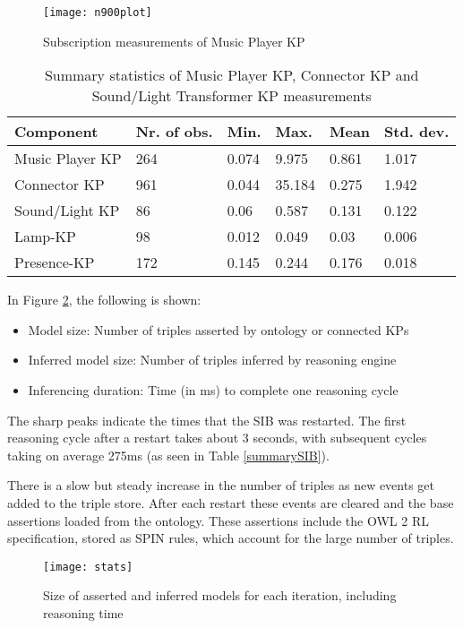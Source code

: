 \begin{figure}
\centering
\texttt{[image: n900plot]}
\caption{Subscription measurements of Music Player KP}
\label{n900plot}
\end{figure}

\begin{table}[!t]
\caption{Summary statistics of Music Player KP, Connector KP and Sound/Light Transformer KP measurements}
\label{summaryKP}
\centering
\begin{tabular}{|l|l|l|l|l|l|}
\hline
Component &	 Nr. of obs. & Min. & Max. & Mean &	Std. dev.\\
\hline
Music Player KP & 264 & 0.074 & 9.975 & 0.861 & 1.017\\
Connector KP & 961 & 0.044 & 35.184 & 0.275 & 1.942\\
Sound/Light KP  & 86 & 0.06 & 0.587 & 0.131 & 0.122 \\
Lamp-KP & 98 & 0.012 & 0.049 & 0.03 &0.006 \\
Presence-KP & 172 & 0.145 & 0.244 & 0.176 & 0.018 \\
\hline
\end{tabular}
\end{table}

In Figure \ref{stats}, the following is shown:
\begin{itemize}
\item Model size: Number of triples asserted by ontology or connected KPs
\item Inferred model size: Number of triples inferred by reasoning engine
\item Inferencing duration: Time (in ms) to complete one reasoning cycle
\end{itemize}

The sharp peaks indicate the times that the SIB was restarted. The first reasoning cycle after a restart takes about 3 seconds,  with subsequent cycles taking on average 275ms (as seen in Table \ref{summarySIB}).

There is a slow but steady increase in the number of triples as new events get added to the triple store. After each restart these events are cleared and the base assertions loaded from the ontology. These assertions include the OWL 2 RL specification, stored as SPIN rules, which account for the large number of triples.

\begin{figure}
\centering
\texttt{[image: stats]}
\caption{Size of asserted and inferred models for each iteration, including reasoning time}
\label{stats}
\end{figure}

